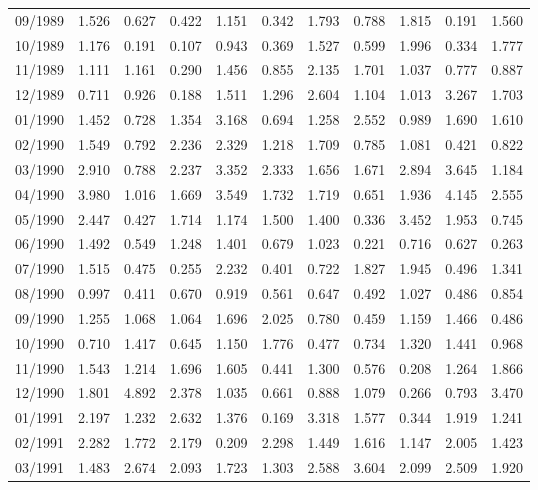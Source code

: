 \begin{tabular}{lrrrrrrrrrr}
09/1989 &  1.526 &  0.627 &  0.422 &  1.151 &  0.342 &  1.793 &  0.788 &  1.815 &  0.191 &  1.560 \\
10/1989 &  1.176 &  0.191 &  0.107 &  0.943 &  0.369 &  1.527 &  0.599 &  1.996 &  0.334 &  1.777 \\
11/1989 &  1.111 &  1.161 &  0.290 &  1.456 &  0.855 &  2.135 &  1.701 &  1.037 &  0.777 &  0.887 \\
12/1989 &  0.711 &  0.926 &  0.188 &  1.511 &  1.296 &  2.604 &  1.104 &  1.013 &  3.267 &  1.703 \\
01/1990 &  1.452 &  0.728 &  1.354 &  3.168 &  0.694 &  1.258 &  2.552 &  0.989 &  1.690 &  1.610 \\
02/1990 &  1.549 &  0.792 &  2.236 &  2.329 &  1.218 &  1.709 &  0.785 &  1.081 &  0.421 &  0.822 \\
03/1990 &  2.910 &  0.788 &  2.237 &  3.352 &  2.333 &  1.656 &  1.671 &  2.894 &  3.645 &  1.184 \\
04/1990 &  3.980 &  1.016 &  1.669 &  3.549 &  1.732 &  1.719 &  0.651 &  1.936 &  4.145 &  2.555 \\
05/1990 &  2.447 &  0.427 &  1.714 &  1.174 &  1.500 &  1.400 &  0.336 &  3.452 &  1.953 &  0.745 \\
06/1990 &  1.492 &  0.549 &  1.248 &  1.401 &  0.679 &  1.023 &  0.221 &  0.716 &  0.627 &  0.263 \\
07/1990 &  1.515 &  0.475 &  0.255 &  2.232 &  0.401 &  0.722 &  1.827 &  1.945 &  0.496 &  1.341 \\
08/1990 &  0.997 &  0.411 &  0.670 &  0.919 &  0.561 &  0.647 &  0.492 &  1.027 &  0.486 &  0.854 \\
09/1990 &  1.255 &  1.068 &  1.064 &  1.696 &  2.025 &  0.780 &  0.459 &  1.159 &  1.466 &  0.486 \\
10/1990 &  0.710 &  1.417 &  0.645 &  1.150 &  1.776 &  0.477 &  0.734 &  1.320 &  1.441 &  0.968 \\
11/1990 &  1.543 &  1.214 &  1.696 &  1.605 &  0.441 &  1.300 &  0.576 &  0.208 &  1.264 &  1.866 \\
12/1990 &  1.801 &  4.892 &  2.378 &  1.035 &  0.661 &  0.888 &  1.079 &  0.266 &  0.793 &  3.470 \\
01/1991 &  2.197 &  1.232 &  2.632 &  1.376 &  0.169 &  3.318 &  1.577 &  0.344 &  1.919 &  1.241 \\
02/1991 &  2.282 &  1.772 &  2.179 &  0.209 &  2.298 &  1.449 &  1.616 &  1.147 &  2.005 &  1.423 \\
03/1991 &  1.483 &  2.674 &  2.093 &  1.723 &  1.303 &  2.588 &  3.604 &  2.099 &  2.509 &  1.920 \\

\end{tabular}
